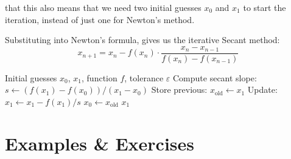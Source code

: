 \vspace{2em}
 that this also means that we need two initial guesses $x_0$ and $x_1$ to start the iteration,
instead of just one for Newton's method.

Substituting into Newton's formula, gives us the iterative Secant method:
\begin{equation}
    x_{n+1} = x_n - f(x_n) \cdot \frac{x_n - x_{n-1}}{f(x_n) - f(x_{n-1})}
\end{equation}

\vspace{2em}

\begin{algorithm}[H]
\caption{Secant Method}
\begin{algorithmic}[1]
    \Require Initial guesses $x_0$, $x_1$, function $f$, tolerance $\varepsilon$
        \State Compute secant slope: $s \gets (f(x_1) - f(x_0)) / (x_1 - x_0)$
        \State Store previous: $x_{\text{old}} \gets x_1$
        \State Update: $x_1 \gets x_1 - f(x_1) / s$
        \State $x_0 \gets x_{\text{old}}$
    \EndWhile
    \Return $x_1$
\end{algorithmic}
\end{algorithm}





















\newpage
\section{Examples \& Exercises}


